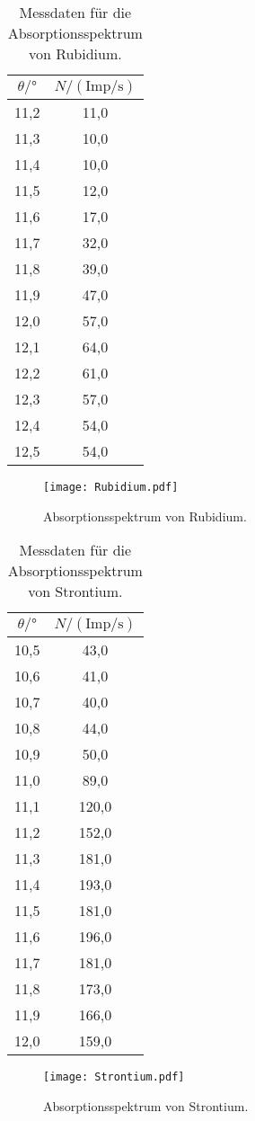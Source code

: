 \begin{table}[H]
    \centering
    \caption{Messdaten für die Absorptionsspektrum von Rubidium.}
    \label{tab:Rubidium}
    \begin{tabular}{|c| c|}
    \toprule
    $\theta/\mathrm{°}$ & $N/(\mathrm{Imp/s})$ \\
    \midrule
    11,2 &  11,0 \\
    11,3 &	10,0 \\
    11,4 &	10,0 \\
    11,5 &	12,0 \\
    11,6 &	17,0 \\ 
    11,7 &	32,0 \\
    11,8 &	39,0 \\
    11,9 &	47,0 \\
    12,0 &	57,0 \\
    12,1 &	64,0 \\
    12,2 &	61,0 \\
    12,3 &	57,0 \\
    12,4 &	54,0 \\
    12,5 &	54,0 \\
    \bottomrule
    \end{tabular}
\end{table}
\begin{figure}[H]
    \centering
    \texttt{[image: Rubidium.pdf]}
    \caption{Absorptionsspektrum von Rubidium.}
    \label{fig:Rubidium}
  \end{figure}

\begin{table}[H]
    \centering
    \caption{Messdaten für die Absorptionsspektrum von Strontium.}
    \label{tab:Strontium}
    \begin{tabular}{|c| c|}
    \toprule
    $\theta/\mathrm{°}$ & $N/(\mathrm{Imp/s})$ \\
    \midrule
    10,5 &	43,0 \\
    10,6 &	41,0 \\
    10,7 &	40,0 \\
    10,8 &	44,0 \\
    10,9 &	50,0 \\
    11,0 &	89,0 \\
    11,1 &	120,0 \\
    11,2 &	152,0 \\
    11,3 &	181,0 \\
    11,4 & 	193,0 \\
    11,5 &	181,0 \\
    11,6 &	196,0 \\
    11,7 &	181,0 \\
    11,8 &	173,0 \\
    11,9 &	166,0 \\
    12,0 &	159,0 \\
    \bottomrule
    \end{tabular}
\end{table}
\begin{figure}[H]
    \centering
    \texttt{[image: Strontium.pdf]}
    \caption{Absorptionsspektrum von Strontium.}
    \label{fig:Strontium}
  \end{figure}

